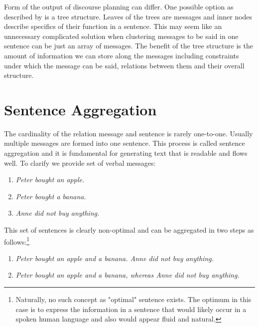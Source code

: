 Form of the output of discourse planning can differ. One possible option as described by \cite{reiter1997building} is a tree structure. Leaves of the trees are messages and inner nodes describe specifics of their function in a sentence. This may seem like an unnecessary complicated solution when clustering messages to be said in one sentence can be just an array of messages. The benefit of the tree structure is the amount of information we can store along the messages including constraints under which the message can be said, relations between them and their overall structure.

\section{Sentence Aggregation}\label{section:sa}
The cardinality of the relation message and sentence is rarely one-to-one. Usually multiple messages are formed into one sentence. This process is called sentence aggregation and it is fundamental for generating text that is readable and flows well. To clarify we provide set of verbal messages:
\begin{enumerate}
	\item \emph{Peter bought an apple.}\label{sa-one}
	\item \emph{Peter bought a banana.}\label{sa-two}
	\item \emph{Anne did not buy anything.}\label{sa-three}	
\end{enumerate}

This set of sentences is clearly non-optimal and can be aggregated in two steps as follows:\footnote{\label{footnote-opt}Naturally, no such concept as "optimal" sentence exists. The optimum in this case is to express the information in a sentence that would likely occur in a spoken human language and also would appear fluid and natural.}
\begin{enumerate}[resume]
	\item \emph{Peter bought an apple and a banana. Anne did not buy anything.}\label{sa-four}
	\item \emph{Peter bought an apple and a banana, whereas Anne did not buy anything.}\label{sa-five}	
\end{enumerate}

